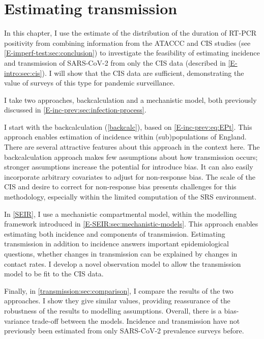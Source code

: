 \documentclass[thesis.tex]{subfiles}
\begin{document}
\ifSubfilesClassLoaded{
    \setcounter{chapter}{6}
}

\chapter{Estimating transmission} \label{transmission}

In this chapter, I use the estimate of the distribution of the duration of RT-PCR positivity from combining information from the ATACCC and CIS studies (see \cref{E-imperf-test:sec:conclusion}) to investigate the feasibility of estimating incidence and transmission of SARS-CoV-2 from only the CIS data (described in \cref{E-intro:sec:cis}).
I will show that the CIS data are sufficient, demonstrating the value of surveys of this type for pandemic surveillance.

I take two approaches, backcalculation and a mechanistic model, both previously discussed in \cref{E-inc-prev:sec:infection-process}.

I start with the backcalculation (\cref{backcalc}), based on \cref{E-inc-prev:eq:EPt}.
This approach enables estimation of incidence within (sub)populations of England.
There are several attractive features about this approach in the context here.
The backcalculation approach makes few assumptions about how transmission occurs; stronger assumptions increase the potential for introduce bias.
It can also easily incorporate arbitrary covariates to adjust for non-response bias.
The scale of the CIS and desire to correct for non-response bias presents challenges for this methodology, especially within the limited computation of the SRS environment.

In \cref{SEIR}, I use a mechanistic compartmental model, within the modelling framework introduced in \cref{E-SEIR:sec:mechanistic-models}.
This approach enables estimating both incidence and components of transmission.
Estimating transmission in addition to incidence answers important epidemiological questions, \eg whether changes in transmission can be explained by changes in contact rates.
I develop a novel observation model to allow the transmission model to be fit to the CIS data.

Finally, in \cref{transmission:sec:comparison}, I compare the results of the two approaches.
I show they give similar values, providing reassurance of the robustness of the results to modelling assumptions.
Overall, there is a bias-variance trade-off between the models.
Incidence and transmission have not previously been estimated from only SARS-CoV-2 prevalence surveys before.
\end{document}

